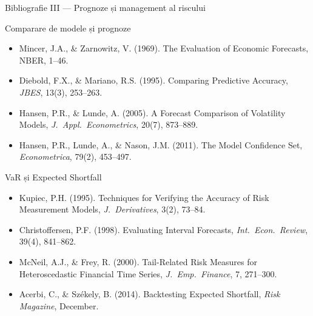 \documentclass[9pt, aspectratio=169, t]{beamer}
\begin{document}
\begin{frame}{Bibliografie III --- Prognoze și management al riscului}
    \small
    \vspace{-0.3cm}
        \begin{block}{Comparare de modele și prognoze}
            \begin{itemize}
                \item Mincer, J.A., \& Zarnowitz, V. (1969). The Evaluation of Economic Forecasts, NBER, 1--46.
                \item Diebold, F.X., \& Mariano, R.S. (1995). Comparing Predictive Accuracy, \textit{JBES}, 13(3), 253--263.
                \item Hansen, P.R., \& Lunde, A. (2005). A Forecast Comparison of Volatility Models, \textit{J.\ Appl.\ Econometrics}, 20(7), 873--889.
                \item Hansen, P.R., Lunde, A., \& Nason, J.M. (2011). The Model Confidence Set, \textit{Econometrica}, 79(2), 453--497.
            \end{itemize}
        \end{block}
        \vspace{-0.15cm}
        \begin{exampleblock}{VaR și Expected Shortfall}
            \begin{itemize}
                \item Kupiec, P.H. (1995). Techniques for Verifying the Accuracy of Risk Measurement Models, \textit{J.\ Derivatives}, 3(2), 73--84.
                \item Christoffersen, P.F. (1998). Evaluating Interval Forecasts, \textit{Int.\ Econ.\ Review}, 39(4), 841--862.
                \item McNeil, A.J., \& Frey, R. (2000). Tail-Related Risk Measures for Heteroscedastic Financial Time Series, \textit{J.\ Emp.\ Finance}, 7, 271--300.
                \item Acerbi, C., \& Sz\'ekely, B. (2014). Backtesting Expected Shortfall, \textit{Risk Magazine}, December.
            \end{itemize}
        \end{exampleblock}
\end{frame}
\end{document}
